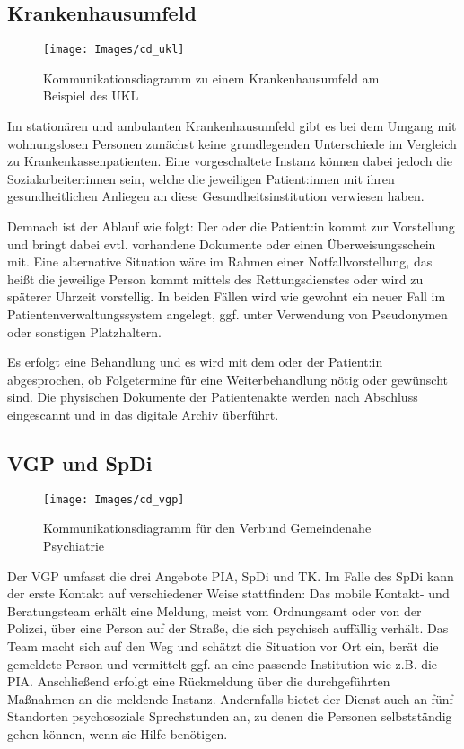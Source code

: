 \subsection{Krankenhausumfeld}\label{sub:ukl}

\begin{figure}[h]
	\centering
	\texttt{[image: Images/cd\_ukl]}
	\caption[Kommunikationsdiagramm UKL]{Kommunikationsdiagramm zu einem Krankenhausumfeld am Beispiel des UKL}
	\label{fig:cdUKL}
\end{figure}

Im stationären und ambulanten Krankenhausumfeld gibt es bei dem Umgang mit wohnungslosen Personen zunächst keine grundlegenden Unterschiede im Vergleich zu Krankenkassenpatienten. Eine vorgeschaltete Instanz können dabei jedoch die Sozialarbeiter:innen sein, welche die jeweiligen Patient:innen mit ihren gesundheitlichen Anliegen an diese Gesundheitsinstitution verwiesen haben.

Demnach ist der Ablauf wie folgt: Der oder die Patient:in kommt zur Vorstellung und bringt dabei evtl. vorhandene Dokumente oder einen Überweisungsschein mit. Eine alternative Situation wäre im Rahmen einer Notfallvorstellung, das heißt die jeweilige Person kommt mittels des Rettungsdienstes oder wird zu späterer Uhrzeit vorstellig. In beiden Fällen wird wie gewohnt ein neuer Fall im Patientenverwaltungssystem angelegt, ggf. unter Verwendung von Pseudonymen oder sonstigen Platzhaltern.

Es erfolgt eine Behandlung und es wird mit dem oder der Patient:in abgesprochen, ob Folgetermine für eine Weiterbehandlung nötig oder gewünscht sind. Die physischen Dokumente der Patientenakte werden nach Abschluss eingescannt und in das digitale Archiv überführt. 

\subsection{VGP und SpDi}\label{sub:vgp}

\begin{figure}[h]
	\centering
	\texttt{[image: Images/cd\_vgp]}
	\caption[Kommunikationsdiagramm VGP]{Kommunikationsdiagramm für den Verbund Gemeindenahe Psychiatrie}
	\label{fig:cdVGP}
\end{figure}

Der \ac{VGP} umfasst die drei Angebote \acf{PIA}, \acf{SpDi} und \acf{TK}. Im Falle des \ac{SpDi} kann der erste Kontakt auf verschiedener Weise stattfinden: Das mobile Kontakt- und Beratungsteam erhält eine Meldung, meist vom Ordnungsamt oder von der Polizei, über eine Person auf der Straße, die sich psychisch auffällig verhält. Das Team macht sich auf den Weg und schätzt die Situation vor Ort ein, berät die gemeldete Person und vermittelt ggf. an eine passende Institution wie z.B. die \ac{PIA}. Anschließend erfolgt eine Rückmeldung über die durchgeführten Maßnahmen an die meldende Instanz. Andernfalls bietet der Dienst auch an fünf Standorten psychosoziale Sprechstunden an, zu denen die Personen selbstständig gehen können, wenn sie Hilfe benötigen.

